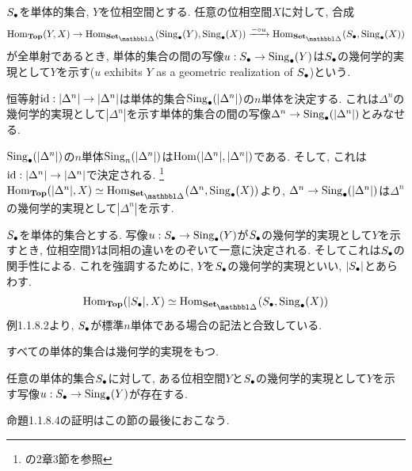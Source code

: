 \documentclass[uplatex, a4paper, 14Q, dvipdfmx]{jsreport}
\begin{document}
\begin{definition}
  $\S$を単体的集合, $Y$を位相空間とする. 
  任意の位相空間$X$に対して, 合成
  \begin{align*}
    \Hom_{\Top}(Y,X) \to \Hom_{\sset}(\Sing_\bullet(Y),\Sing_\bullet(X)) 
    \xr{- \ci u} \Hom_{\sset}(\S,\Sing_\bullet(X))
  \end{align*}
  が全単射であるとき, 単体的集合の間の写像$u: \S \to \Sing_\bullet(Y)$は$\S$の幾何学的実現として$Y$を示す($u$ exhibits $Y$ as a geometric realization of $\S$)という. 
\end{definition}

\begin{example}
  恒等射$\id: |\Delta^n| \to |\Delta^n|$は単体的集合$\Sing_\bullet(|\Delta^n|)$の$n$単体を決定する. 
  これは$\Delta^n$の幾何学的実現として$|\Delta^n|$を示す単体的集合の間の写像$\Delta^n \to \Sing_\bullet(|\Delta^n|)$とみなせる. 
\end{example}

\begin{Proof}
  $\Sing_\bullet(|\Delta^n|)$の$n$単体$\Sing_n(|\Delta^n|)$は$\Hom(|\Delta^n|,|\Delta^n|)$である. 
  そして, これは$\id: |\Delta^n| \to |\Delta^n|$で決定される.
  \footnote{
    \cite{Alg-d}の2章3節を参照
  } 
  $\Hom_{\Top}(|\Delta^n|,X) \simeq \Hom_{\sset}(\Delta^n,\Sing_\bullet(X))$より, $\Delta^n \to \Sing_\bullet(|\Delta^n|)$は$\Delta^n$の幾何学的実現として$|\Delta^n|$を示す. 
\end{Proof}

\begin{nota}
  $\S$を単体的集合とする. 
  写像$u: \S \to \Sing_\bullet(Y)$が$\S$の幾何学的実現として$Y$を示すとき, 位相空間$Y$は同相の違いをのぞいて一意に決定される. 
  そしてこれは$\S$の関手性による. 
  これを強調するために, $Y$を$\S$の幾何学的実現といい, $|\S|$とあらわす. 
  \begin{align*}
    \Hom_{\Top}(|\S|,X) \simeq \Hom_{\sset}(\S,\Sing_\bullet(X))
  \end{align*}
  例1.1.8.2より, $\S$が標準$n$単体である場合の記法と合致している. 
\end{nota}

すべての単体的集合は幾何学的実現をもつ. 

\begin{prop}
  任意の単体的集合$\S$に対して, ある位相空間$Y$と$\S$の幾何学的実現として$Y$を示す写像$u: \S \to \Sing_\bullet(Y)$が存在する. 
\end{prop}

命題1.1.8.4の証明はこの節の最後におこなう. 
\end{document}
